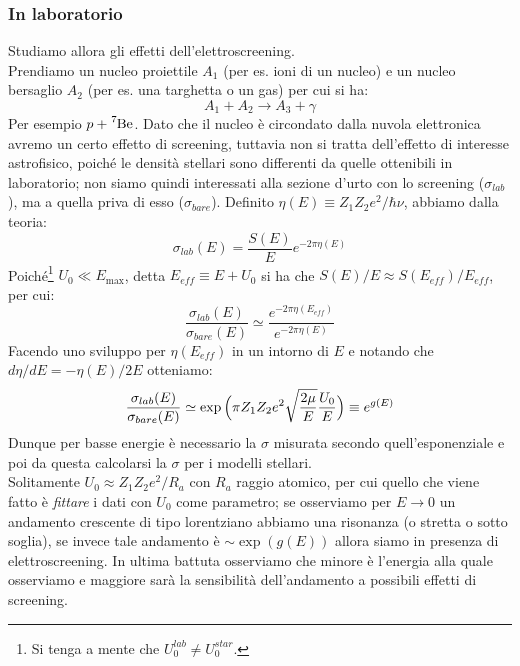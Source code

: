 \subsubsection{In laboratorio}
Studiamo allora gli effetti dell'elettroscreening.\\
Prendiamo un nucleo proiettile $A_1$ (per es. ioni di un nucleo) e un nucleo bersaglio $A_2$ (per es. una targhetta o un gas) per cui si ha:
$$A_1+A_2 \to A_3 + \gamma$$
Per esempio $p+\ce{^7Be}$. Dato che il nucleo è circondato dalla nuvola elettronica avremo un certo effetto di screening, tuttavia non si tratta dell'effetto di interesse astrofisico, poiché le densità stellari sono differenti da quelle ottenibili in laboratorio; non siamo quindi interessati alla sezione d'urto con lo screening ($\sigma_{lab}$), ma a quella priva di esso ($\sigma_{bare}$). Definito $\eta(E)\equiv Z_1Z_2e^2/\hbar\nu$, abbiamo dalla teoria:
$$\sigma_{lab}(E) = \frac{S(E)}{E}e^{-2\pi \eta(E)}$$
Poiché\footnote{Si tenga a mente che $U_0^{lab}\not= U_{0}^{star}$.} $U_0\ll E_{\max{}}$, detta $E_{eff}\equiv E+U_0$ si ha che $S(E)/E\approx S(E_{eff})/E_{eff}$, per cui:
$$\frac{\sigma_{lab}(E)}{\sigma_{bare}(E)} \simeq \frac{e^{-2\pi\eta(E_{eff})}}{e^{-2\pi\eta(E)}}$$
Facendo uno sviluppo per $\eta(E_{eff})$ in un intorno di $E$ e notando che $d\eta/dE = -\eta(E)/2E$ otteniamo:
$$\frac{\sigma_{lab}(E)}{\sigma_{bare}(E)} \simeq \exp{\Bigl ( \pi Z_1Z_2e^2 \sqrt{\frac{2\mu}{E}}\frac{U_0}{E} \Bigr )}\equiv e^{g(E)}$$
Dunque per basse energie è necessario  la $\sigma$ misurata secondo quell'esponenziale e poi da questa calcolarsi la $\sigma$ per i modelli stellari.\\
Solitamente $U_0\approx Z_1Z_2 e^2/R_a$ con $R_a$ raggio atomico, per cui quello che viene fatto è \textit{fittare} i dati con $U_0$ come parametro; se osserviamo per $E\to0$ un andamento crescente di tipo lorentziano abbiamo una risonanza (o stretta o sotto soglia), se invece tale andamento è $\sim \exp{(g(E))}$ allora siamo in presenza di elettroscreening. In ultima battuta osserviamo che minore è l'energia alla quale osserviamo e maggiore sarà la sensibilità dell'andamento a possibili effetti di screening.
